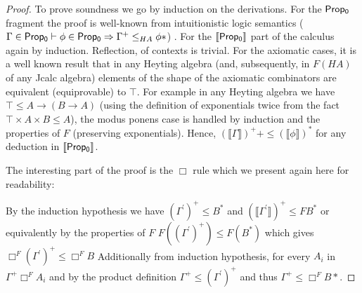 \begin{proof}
    To prove soundness we go by induction on the derivations. 
    For the ${\sf Prop_0}$ fragment
    the proof is well-known from intuitionistic logic semantics 
    ($\Gamma\in{\sf Prop_0}\vdash \phi\in {\sf Prop_0}
    \Rightarrow \Gamma^+\le_{HA}\phi *$)
    . 
    For the ${\sf \llbracket Prop_0\rrbracket}$ part of the calculus again by induction.
    Reflection, of contexts is trivial. For the axiomatic cases, it is a well known result
    that in any Heyting algebra (and, subsequently, in $F(HA)$ of any Jcalc algebra) 
    elements of the shape of the axiomatic combinators are equivalent 
    (equiprovable) to $\top$.
    For example in any Heyting algebra  we have $\top\le A\rightarrow(B\rightarrow A)$ 
    (using the definition of exponentials twice from the fact $\top\times A\times B\le A$), 
    the modus ponens case is handled by induction and the properties of $F$ 
    (preserving exponentials). Hence,
    $(\llbracket\Gamma\rrbracket)^{+}+\leq(\llbracket\phi\rrbracket)^{*}$ for any deduction in $\llbracket{\sf Prop_0} \rrbracket$.


    The interesting part of the proof is the $\Box$ rule which we present again here for readability:
    
    By the induction hypothesis we have $(\Gamma^{'})^{+}\le B^{*}$
    and $(\llbracket\Gamma^{'}\rrbracket)^{+}\le FB^{*}$ or equivalently by the properties of $F$
    $F((\Gamma^{'})^{+})\le F(B^{*})$ which gives $\Box^F{(\Gamma^{'})^{+}}\le \Box^F B$
    Additionally from induction hypothesis, for every $A_i$ in $\Gamma^{+}\Box^F A_i$
    and by the product definition $\Gamma^{+}\le(\Gamma^{'})^{+}$ and thus
    $\Gamma^{+}\le\Box^F B*$.


\end{proof}
